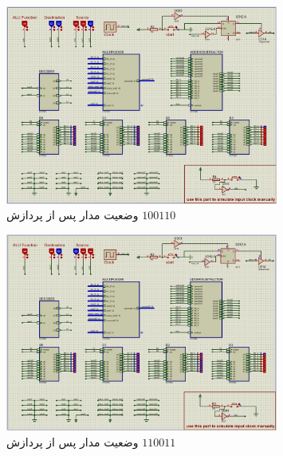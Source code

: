 \documentclass[12pt,onecolumn,a4paper,fleqn]{article}
\begin{document}
	\begin{figure}[H]
		\centering
		\includegraphics[width=0.8\textwidth]{source/inst6.png}
		\caption{‌وضعیت مدار پس از پردازش
			$100110$}
	\end{figure}
	\begin{figure}[H]
		\centering
		\includegraphics[width=0.8\textwidth]{source/inst7.png}
		\caption{‌وضعیت مدار پس از پردازش
			$110011$}
	\end{figure}	
\end{document}
